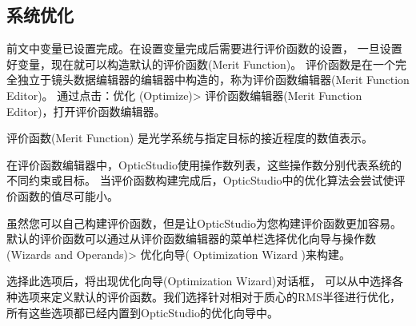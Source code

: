 \documentclass{article}
\begin{document}
\subsection{系统优化}
前文中变量已设置完成。在设置变量完成后需要进行评价函数的设置，
一旦设置好变量，现在就可以构造默认的评价函数(Merit Function)。
评价函数是在一个完全独立于镜头数据编辑器的编辑器中构造的，称为评价函数编辑器(Merit Function Editor)。
通过点击：优化 (Optimize)> 评价函数编辑器(Merit Function Editor)，打开评价函数编辑器。

评价函数(Merit Function)
是光学系统与指定目标的接近程度的数值表示。

在评价函数编辑器中，OpticStudio使用操作数列表，这些操作数分别代表系统的不同约束或目标。
当评价函数构建完成后，OpticStudio中的优化算法会尝试使评价函数的值尽可能小。

虽然您可以自己构建评价函数，但是让OpticStudio为您构建评价函数更加容易。
默认的评价函数可以通过从评价函数编辑器的菜单栏选择优化向导与操作数(Wizards and Operands)>
优化向导( Optimization Wizard )来构建。


选择此选项后，将出现优化向导(Optimization Wizard)对话框，
可以从中选择各种选项来定义默认的评价函数。我们选择针对相对于质心的RMS半径进行优化，
所有这些选项都已经内置到OpticStudio的优化向导中。
\end{document}
